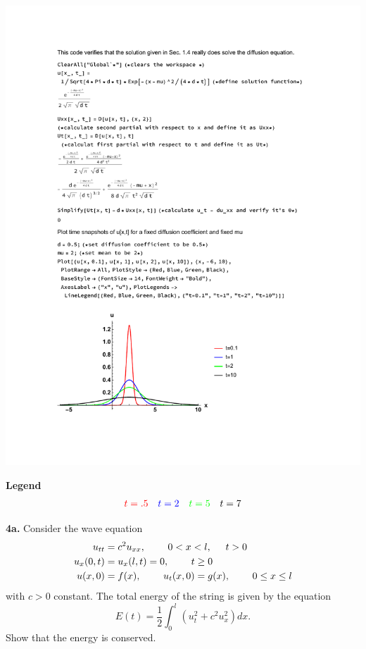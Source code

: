 \documentclass{article}
\begin{document}
\begin{centering}
\includegraphics[scale=1.35]{timesnap}
\end{centering}

\begin{tcolorbox}

\textbf{Legend}
\begin{align*}
 \color{red} t=.5  &&  \color{blue} t=2 && \color{green} t=5  &&  t=7
\end{align*}

\end{tcolorbox}

\newpage
\textbf{4a.} Consider the wave equation 
\begin{align}
u_{tt} &= c^2u_{xx},   \hspace{8mm} 0<x<l, \hspace{5mm} t>0  \\
u_x(0,t) &= u_x(l,t) = 0,  \hspace{8mm} t\geq0  \\
u(x,0) &=f(x),  \hspace{8mm} u_t(x,0)=g(x), \hspace{8mm} 0 \leq x\leq l
\end{align}
with \(c>0\) constant. The total energy of the string is given by the equation 
\[
E(t) = \frac{1}{2} \int_{0}^l (u_t^2+c^2u_x^2 )dx. 
\]
Show that the energy is conserved. 
\end{document}
